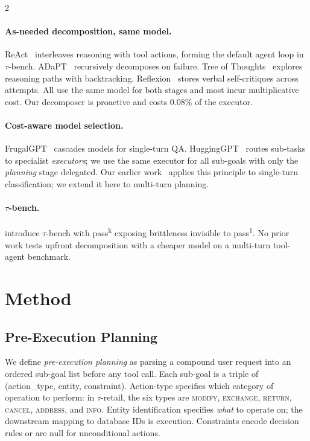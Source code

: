 \documentclass[11pt,a4paper]{article}
\begin{document}
\begin{multicols}{2}
\paragraph{As-needed decomposition, same model.} ReAct~\citep{yao2023react} interleaves reasoning with tool actions, forming the default agent loop in $\tau$-bench. ADaPT~\citep{prasad2024adapt} recursively decomposes on failure. Tree of Thoughts~\citep{yao2023tree} explores reasoning paths with backtracking. Reflexion~\citep{shinn2023reflexion} stores verbal self-critiques across attempts. All use the same model for both stages and most incur multiplicative cost. Our decomposer is proactive and costs 0.08\% of the executor.

\paragraph{Cost-aware model selection.} FrugalGPT~\citep{chen2023frugalgpt} cascades models for single-turn QA. HuggingGPT~\citep{shen2023hugginggpt} routes sub-tasks to specialist \emph{executors}; we use the same executor for all sub-goals with only the \emph{planning} stage delegated. Our earlier work~\citep{chen2026routing} applies this principle to single-turn classification; we extend it here to multi-turn planning.

\paragraph{$\tau$-bench.} \citet{yao2024tau} introduce $\tau$-bench with pass\textsuperscript{k} exposing brittleness invisible to pass\textsuperscript{1}. No prior work tests upfront decomposition with a cheaper model on a multi-turn tool-agent benchmark.


\section{Method}

\subsection{Pre-Execution Planning}\label{sec:definition}

We define \emph{pre-execution planning} as parsing a compound user request into an ordered sub-goal list before any tool call. Each sub-goal is a triple of (action\_type, entity, constraint). Action-type specifies which category of operation to perform: in $\tau$-retail, the six types are \textsc{modify}, \textsc{exchange}, \textsc{return}, \textsc{cancel}, \textsc{address}, and \textsc{info}. Entity identification specifies \emph{what} to operate on; the downstream mapping to database IDs is execution. Constraints encode decision rules or are null for unconditional actions.


\end{multicols}
\end{document}
